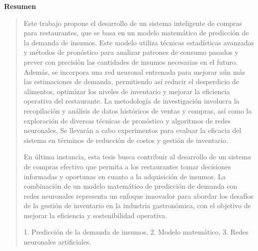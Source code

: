 \thispagestyle{empty}
\begin{center}
\begin{LARGE}
\textbf{Resumen}
\end{LARGE}
\end{center}
\begin{quotation}

    Este trabajo propone el desarrollo de un sistema inteligente de compras para restaurantes, que se basa en un modelo matemático de predicción de la demanda de insumos. Este modelo utiliza técnicas estadísticas avanzadas y métodos de pronóstico para analizar patrones de consumo pasados y prever con precisión las cantidades de insumos necesarias en el futuro. Además, se incorpora una red neuronal entrenada para mejorar aún más las estimaciones de demanda, permitiendo así reducir el desperdicio de alimentos, optimizar los niveles de inventario y mejorar la eficiencia operativa del restaurante. La metodología de investigación involucra la recopilación y análisis de datos históricos de ventas y compras, así como la exploración de diversas técnicas de pronóstico y algoritmos de redes neuronales. Se llevarán a cabo experimentos para evaluar la eficacia del sistema en términos de reducción de costos y gestión de inventario.

    En última instancia, esta tesis busca contribuir al desarrollo de un sistema de compras efectivo que permita a los restaurantes tomar decisiones informadas y oportunas en cuanto a la adquisición de insumos. La combinación de un modelo matemático de predicción de demanda con redes neuronales representa un enfoque innovador para abordar los desafíos de la gestión de inventario en la industria gastronómica, con el objetivo de mejorar la eficiencia y sostenibilidad operativa.
    
    
    
    
    
    
\vspace*{0.5cm}

 1. Predicción de la demanda de insumos, 2. Modelo matemático, 3. Redes neuronales artificiales.

\end{quotation}
